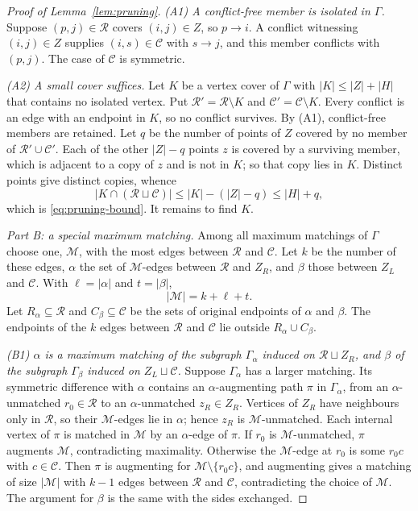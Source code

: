 \documentclass[11pt]{article}
\theoremstyle{remark}
\newcommand{\abs}[1]{\lvert #1\rvert}
\begin{document}
\begin{proof}[Proof of Lemma~\ref{lem:pruning}]
\emph{(A1) A conflict-free member is isolated in $\Gamma$.}
Suppose $(p,j)\in\mathcal R$ covers $(i,j)\in Z$, so $p\to i$.  A conflict
witnessing $(i,j)\in Z$ supplies $(i,s)\in\mathcal C$ with $s\to j$, and
this member conflicts with $(p,j)$.  The case of $\mathcal C$ is symmetric.

\emph{(A2) A small cover suffices.}
Let $K$ be a vertex cover of $\Gamma$ with $\abs K\le\abs Z+\abs H$ that
contains no isolated vertex.  Put $\mathcal R'=\mathcal R\setminus K$ and
$\mathcal C'=\mathcal C\setminus K$.  Every conflict is an edge with an
endpoint in $K$, so no conflict survives.  By (A1), conflict-free members
are retained.  Let $q$ be the number of points of $Z$ covered by no member
of $\mathcal R'\cup\mathcal C'$.  Each of the other $\abs Z-q$ points $z$ is
covered by a surviving member, which is adjacent to a copy of $z$ and is not
in $K$; so that copy lies in $K$.  Distinct points give distinct copies,
whence
\begin{equation}\label{eq:cover-charge}
 \abs{K\cap(\mathcal R\sqcup\mathcal C)}
 \leq \abs K-(\abs Z-q)\leq\abs H+q,
\end{equation}
which is \eqref{eq:pruning-bound}.  It remains to find $K$.

\medskip\noindent
\emph{Part B: a special maximum matching.}
Among all maximum matchings of $\Gamma$ choose one, $\mathcal M$, with the
most edges between $\mathcal R$ and $\mathcal C$.  Let $k$ be the number of
these edges, $\alpha$ the set of $\mathcal M$-edges between $\mathcal R$ and
$Z_R$, and $\beta$ those between $Z_L$ and $\mathcal C$.  With
$\ell=\abs\alpha$ and $t=\abs\beta$,
\[
 \abs{\mathcal M}=k+\ell+t.
\]
Let $R_\alpha\subseteq\mathcal R$ and $C_\beta\subseteq\mathcal C$ be the
sets of original endpoints of $\alpha$ and $\beta$.  The endpoints of the
$k$ edges between $\mathcal R$ and $\mathcal C$ lie outside
$R_\alpha\cup C_\beta$.

\emph{(B1) $\alpha$ is a maximum matching of the subgraph $\Gamma_\alpha$
induced on $\mathcal R\sqcup Z_R$, and $\beta$ of the subgraph
$\Gamma_\beta$ induced on $Z_L\sqcup\mathcal C$.}
Suppose $\Gamma_\alpha$ has a larger matching.  Its symmetric difference
with $\alpha$ contains an $\alpha$-augmenting path $\pi$ in $\Gamma_\alpha$,
from an $\alpha$-unmatched $r_0\in\mathcal R$ to an $\alpha$-unmatched
$z_R\in Z_R$.  Vertices of $Z_R$ have neighbours only in $\mathcal R$, so
their $\mathcal M$-edges lie in $\alpha$; hence $z_R$ is
$\mathcal M$-unmatched.  Each internal vertex of $\pi$ is matched in
$\mathcal M$ by an $\alpha$-edge of $\pi$.  If $r_0$ is
$\mathcal M$-unmatched, $\pi$ augments $\mathcal M$, contradicting
maximality.  Otherwise the $\mathcal M$-edge at $r_0$ is some $r_0c$ with
$c\in\mathcal C$.  Then $\pi$ is augmenting for
$\mathcal M\setminus\{r_0c\}$, and augmenting gives a matching of size
$\abs{\mathcal M}$ with $k-1$ edges between $\mathcal R$ and $\mathcal C$,
contradicting the choice of $\mathcal M$.  The argument for $\beta$ is the
same with the sides exchanged.


\end{proof}
\end{document}
